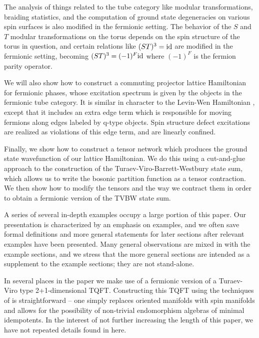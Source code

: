 The analysis of things related to the tube category like modular transformations, braiding statistics, and the computation of ground state degeneracies on various spin surfaces
is also modified in the fermionic setting.  
The behavior of the $S$ and $T$ modular transformations on the torus depends on the spin structure of the torus in question, and 
certain relations like $(ST)^3 = \text{id}$ are modified in the fermionic setting, becoming 
$(ST)^3=(-1)^F\text{id}$ where $(-1)^F$ is the fermion parity operator.

We will also show how to construct a commuting projector lattice Hamiltonian 
for fermionic phases, whose excitation spectrum is given by the objects in the fermionic tube category.  
It is similar in character to the Levin-Wen Hamiltonian \cite{levin2005}, 
except that it includes an extra edge term which is responsible for moving fermions along
edges labeled by q-type objects. 
Spin structure defect excitations 
are realized as violations of this edge term, and are linearly confined. 

Finally, we show how to construct a tensor network which produces the ground state 
wavefunction of our lattice Hamiltonian. We do this using a cut-and-glue approach to 
the construction of the Turaev-Viro-Barrett-Westbury state sum, which allows us to write the bosonic partition function
as a tensor contraction. We then show how to modify the tensors 
and the way we contract them in order to obtain a fermionic version of the TVBW state sum.  

A series of several in-depth examples occupy a large portion 
of this paper.
Our presentation is characterized by an emphasis on examples, 
and we often save formal definitions and more general statements 
for later sections after relevant examples have been presented.  
Many general observations are mixed in with the example sections,
and we stress that the more general sections are intended as a supplement
to the example sections; they are not stand-alone.

In several places in the paper we make use of a fermionic version of a Turaev-Viro type 2+1-dimensional TQFT.
Constructing this TQFT using the techniques of \cite{Walker2006} is straightforward -- one simply replaces oriented manifolds with
spin manifolds and allows for the possibility of non-trivial endomorphism algebras of minimal idempotents.
In the interest of not further increasing the length of this paper, we have not repeated details found in
\cite{Walker2006} here.

